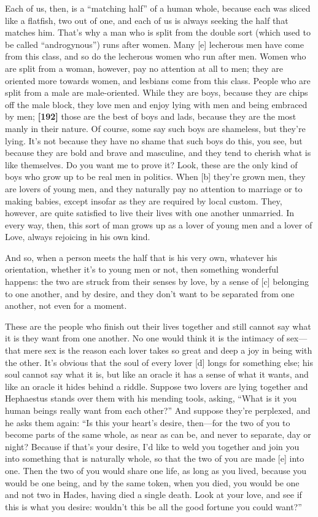 Each of us, then, is a “matching half” of a human whole, because each
was sliced like a flatfish, two out of one, and each of us is always
seeking the half that matches him. That's why a man who is split from
the double sort (which used to be called “androgynous”) runs after
women. Many {[}e{]} lecherous men have come from this class, and so do
the lecherous women who run after men. Women who are split from a woman,
however, pay no attention at all to men; they are oriented more towards
women, and lesbians come from this class. People who are split from a
male are male-oriented. While they are boys, because they are chips off
the male block, they love men and enjoy lying with men and being
embraced by men; {\bf {[}192{]}} those are the best of boys and lads,
because they are the most manly in their nature. Of course, some say
such boys are shameless, but they're lying. It's not because they have
no shame that such boys do this, you see, but because they are bold and
brave and masculine, and they tend to cherish what is like themselves.
Do you want me to prove it? Look, these are the only kind of boys who
grow up to be real men in politics. When {[}b{]} they're grown men, they
are lovers of young men, and they naturally pay no attention to marriage
or to making babies, except insofar as they are required by local
custom. They, however, are quite satisfied to live their lives with one
another unmarried. In every way, then, this sort of man grows up as a
lover of young men and a lover of Love, always rejoicing in his own
kind.

And so, when a person meets the half that is his very own, whatever his
orientation, whether it's to young men or not, then something wonderful
happens: the two are struck from their senses by love, by a sense of
{[}c{]} belonging to one another, and by desire, and they don't want to
be separated from one another, not even for a moment.

These are the people who finish out their lives together and still
cannot say what it is they want from one another. No one would think it
is the intimacy of sex---that mere sex is the reason each lover takes so
great and deep a joy in being with the other. It's obvious that the soul
of every lover {[}d{]} longs for something else; his soul cannot say
what it is, but like an oracle it has a sense of what it wants, and like
an oracle it hides behind a riddle. Suppose two lovers are lying
together and
Hephaestus stands
over them with his mending tools, asking, “What is it you human beings
really want from each other?” And suppose they're perplexed, and he asks
them again: “Is this your heart's desire, then---for the two of you to
become parts of the same whole, as near as can be, and never to
separate, day or night? Because if that's your desire, I'd like to weld
you together and join you into something that is naturally whole, so
that the two of you are made {[}e{]} into one. Then the two of you would
share one life, as long as you lived, because you would be one being,
and by the same token, when you died, you would be one and not two in
Hades, having died a single death. Look at your love, and see if this is
what you desire: wouldn't this be all the good fortune you could want?”

